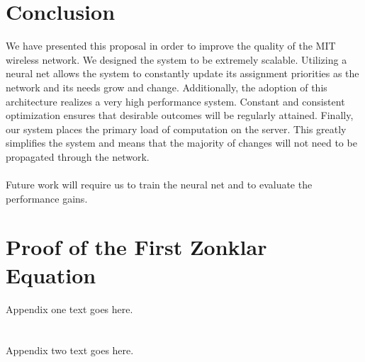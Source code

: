 \documentclass[10pt,journal,compsoc]{IEEEtran}
\begin{document}
		\section{Conclusion}
		We have presented this proposal in order to improve the quality of the MIT wireless network. We designed the system to be extremely scalable.  Utilizing a neural net allows the system to constantly update its assignment priorities as the network and its needs grow and change. Additionally, the adoption of this architecture realizes a very high performance system. Constant and consistent optimization ensures that desirable outcomes will be regularly attained. Finally, our system places the primary load of computation on the server. This greatly simplifies the system and means that the majority of changes will not need to be propagated through the network.\\
		\\
		Future work will require us to train the neural net and to evaluate the performance gains.
		
		\appendices
		\section{Proof of the First Zonklar Equation}
		Appendix one text goes here.
		
		\section{}
		Appendix two text goes here.
		
\end{document}

